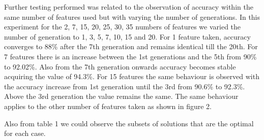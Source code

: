\documentclass[11pt,onecolumn,a4paper]{article}
\begin{document}
Further testing performed was related to the observation of accuracy within the same number of features used but with varying the number of generations. In this experiment for the 2, 7, 15, 20, 25, 30, 35 numbers of features we varied the number of generation to 1, 3, 5, 7, 10, 15 and 20. For 1 feature taken, accuracy converges to 88\% after the 7th generation and remains identical till the 20th. For 7 features there is an increase between the 1st generations and the 5th from 90\% to 92.02\%. Also from the 7th generation onwards accuracy becomes stable acquiring the value of 94.3\%. For 15 features the same behaviour is observed with the accuracy increase from 1st generation until the 3rd from 90.6\% to 92.3\%. Above the 3rd generation the value remains the same. The same behaviour applies to the other number of features taken as shown in figure 2.
\begin{table}[h!]
\caption{Ionosphere Varying Features}
\end{table}
Also from table 1 we could observe the subsets of solutions that are the optimal for each case.
\end{document}
